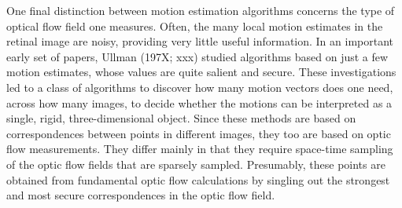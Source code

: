 One final distinction between motion estimation algorithms
concerns the type of optical flow field one measures.
Often, the many local motion estimates in the retinal image
are noisy, providing very little useful information.
In an important early set of papers,
Ullman (197X; xxx) studied algorithms based on
just a few motion estimates,
whose values are quite salient and secure.
These investigations led to a class of algorithms to discover
how many motion vectors does one need, across how many
images, to decide whether the motions
can be interpreted as a single, rigid, three-dimensional object.
Since these methods are based on correspondences between
points in different images, they too are based on optic
flow measurements.
They differ mainly in that they require
space-time sampling of the optic flow fields that
are sparsely sampled.
Presumably, these points are obtained from fundamental
optic flow calculations by singling out the strongest
and most secure correspondences in the optic flow field.

